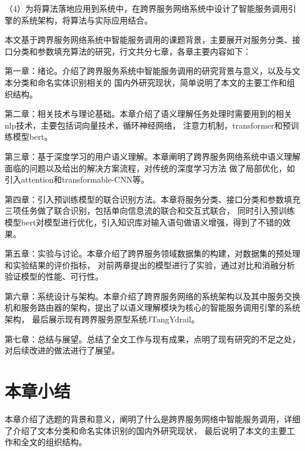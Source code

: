（4）为将算法落地应用到系统中，在跨界服务网络系统中设计了智能服务调用引擎的系统架构，将算法与实际应用结合。

本文基于跨界服务网络系统中智能服务调用的课题背景，主要展开对服务分类、接口分类和参数填充算法的研究，行文共分七章，各章主要内容如下：

第一章：绪论。介绍了跨界服务系统中智能服务调用的研究背景与意义，以及与文本分类和命名实体识别相关的
国内外研究现状，简单说明了本文的主要工作和组织结构。

第二章：相关技术与理论基础。本章介绍了语义理解任务处理时需要用到的相关nlp技术，主要包括词向量技术，循环神经网络，
注意力机制，transformer和预训练模型bert。

第三章：基于深度学习的用户语义理解。本章阐明了跨界服务网络系统中语义理解面临的问题以及给出的解决方案流程，对传统的深度学习方法
做了局部优化，如引入attention和transformable-CNN等。

第四章：引入预训练模型的联合识别方法。本章将服务分类、接口分类和参数填充三项任务做了联合识别，包括单向信息流的联合和交互式联合，
同时引入预训练模型bert对模型进行优化，引入知识库对输入语句做语义增强，得到了不错的效果。

第五章：实验与讨论。本章介绍了跨界服务领域数据集的构建，对数据集的预处理和实验结果的评价指标，
对前两章提出的模型进行了实验，通过对比和消融分析验证模型的性能、可行性。

第六章：系统设计与架构。本章介绍了跨界服务网络的系统架构以及其中服务交换机和服务路由器的架构，提出了以语义理解模块为核心的智能服务调用引擎的系统架构，
最后展示现有跨界服务原型系统JTangYdrail。

第七章：总结与展望。总结了全文工作与现有成果，点明了现有研究的不足之处，对后续改进的做法进行了展望。

\section{本章小结}
本章介绍了选题的背景和意义，阐明了什么是跨界服务网络中智能服务调用，详细了介绍了文本分类和命名实体识别的国内外研究现状，
最后说明了本文的主要工作和全文的组织结构。
